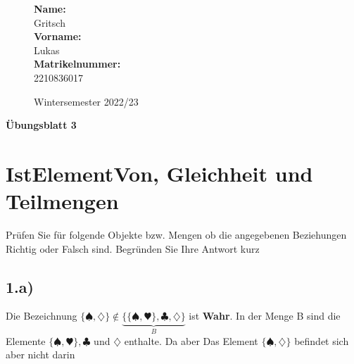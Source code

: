 \documentclass[10pt,ngerman]{scrartcl}
\begin{document}
\begin{figure}[htbp]
\begin{minipage}[b]{0.50\linewidth}
\begin{Large}

	\textbf{Name:}\\
	Gritsch 			\\
	\textbf{Vorname:}\\
	Lukas 				\\
	\textbf{Matrikelnummer:}\\
	2210836017

\end{Large}
\end{minipage}
\begin{minipage}[b]{0.50\linewidth}
\begin{flushright}
\begin{Huge}
\end{Huge}
\vspace{10px}
\begin{large}
Wintersemester 2022/23
\end{large}
\end{flushright}
\end{minipage}
\end{figure}

\vspace{20px}
\begin{huge}
\noindent

\textbf{Übungsblatt 3}
\end{huge}

\pagebreak
\section{IstElementVon, Gleichheit und Teilmengen}
Prüfen Sie für folgende Objekte bzw. Mengen ob die angegebenen Beziehungen Richtig
oder Falsch sind. Begründen Sie Ihre Antwort kurz
\subsection{1.a)}
Die Bezeichnung $\{\spadesuit,\diamondsuit\} \notin \underbrace{\{\{\spadesuit,\varheart\},\clubsuit,\diamondsuit\}}_{B}$ ist \textbf{Wahr}. In der Menge B sind die Elemente $\{\spadesuit,\varheart\},\clubsuit$ und $\diamondsuit$ enthalte. Da aber Das Element $\{\spadesuit,\diamondsuit\}$ befindet sich aber nicht darin
\end{document}
